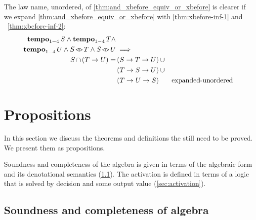 \documentclass[12pt,openright,twoside,a4paper,oldfontcommands,english,brazil,final]{abntex2}
\newcommand{\todo}[1]{\adnote{#1}}
\theoremstyle{theo}
\def\xbeforeop{\ensuremath\rightarrow}
\newcommand{\xbefore}[2]{\ensuremath #1 \xbeforeop #2 }
\def\tempoop{\ensuremath\operatorname{\mathbf{tempo}}}
\newcommand{\tempo}[2][1-4]{\ensuremath\tempoop_{#1} #2}
\def\independenteventsop{\ensuremath\operatorname{\triangleleft\triangleright}}
\newcommand{\independentevents}[2]{\ensuremath #1 \independenteventsop #2}
\newcommand{\parsin}[1]{\ensuremath\left( #1 \right)}
\def\union{\ensuremath\operatorname{\cup}}
\def\inter{\ensuremath\operatorname{\cap}}
\begin{document}
The law name, unordered, of \eqref{thm:and_xbefore_equiv_or_xbefore} is clearer if we expand \eqref{thm:and_xbefore_equiv_or_xbefore} with \eqref{thm:xbefore-inf-1} and ~\eqref{thm:xbefore-inf-2}:
%
\begin{align}
\tempo{S} \land \tempo{T} \land \nonumber\\
  \tempo{U} \land \independentevents{S}{T} \land \independentevents{S}{U} & \implies \nonumber\\
  S \inter \parsin{\xbefore{T}{U}} = &
  \parsin{\xbefore{\xbefore{S}{T}}{U}} \union \nonumber\\
  & \parsin{\xbefore{\xbefore{T}{S}}{U}} \union \nonumber\\
  & \parsin{\xbefore{\xbefore{T}{U}}{S}} &
  \text{expanded-unordered}
  \label{thm:and_xbefore_equiv_or_xbefore_expanded}
%
%
%
\end{align}
%

\section{Propositions}
\label{sec:propositions}

In this section we discuss the theorems and definitions the still need to be proved.
We present them as propositions.

Soundness and completeness of the \ac{algebra} is given in terms of the algebraic form and its denotational semantics (\cref{sec:soundness-completeness-algebra}).
The \ac{activation} is defined in terms of a logic that is solved by decision and some output value (\cref{sec:activation}).

\subsection{Soundness and completeness of \acs*{algebra}}
\label{sec:soundness-completeness-algebra}
\end{document}

